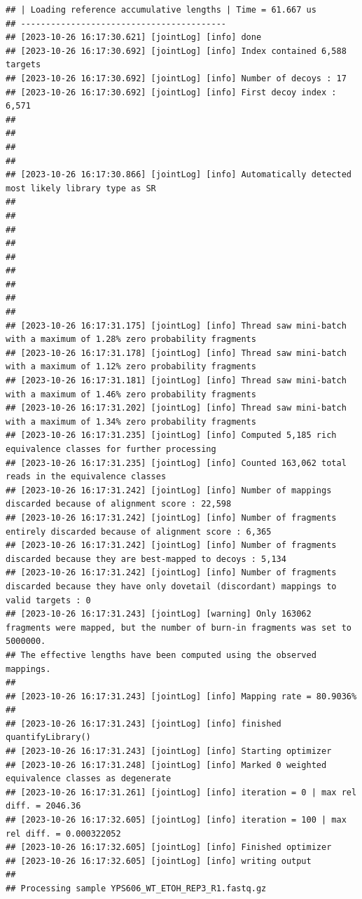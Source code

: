 \documentclass[
]{book}
\begin{document}
\begin{verbatim}
## | Loading reference accumulative lengths | Time = 61.667 us
## -----------------------------------------
## [2023-10-26 16:17:30.621] [jointLog] [info] done
## [2023-10-26 16:17:30.692] [jointLog] [info] Index contained 6,588 targets
## [2023-10-26 16:17:30.692] [jointLog] [info] Number of decoys : 17
## [2023-10-26 16:17:30.692] [jointLog] [info] First decoy index : 6,571 
## 
## 
## 
## 
## [2023-10-26 16:17:30.866] [jointLog] [info] Automatically detected most likely library type as SR
## 
## 
## 
## 
## 
## 
## 
## 
## 
## [2023-10-26 16:17:31.175] [jointLog] [info] Thread saw mini-batch with a maximum of 1.28% zero probability fragments
## [2023-10-26 16:17:31.178] [jointLog] [info] Thread saw mini-batch with a maximum of 1.12% zero probability fragments
## [2023-10-26 16:17:31.181] [jointLog] [info] Thread saw mini-batch with a maximum of 1.46% zero probability fragments
## [2023-10-26 16:17:31.202] [jointLog] [info] Thread saw mini-batch with a maximum of 1.34% zero probability fragments
## [2023-10-26 16:17:31.235] [jointLog] [info] Computed 5,185 rich equivalence classes for further processing
## [2023-10-26 16:17:31.235] [jointLog] [info] Counted 163,062 total reads in the equivalence classes 
## [2023-10-26 16:17:31.242] [jointLog] [info] Number of mappings discarded because of alignment score : 22,598
## [2023-10-26 16:17:31.242] [jointLog] [info] Number of fragments entirely discarded because of alignment score : 6,365
## [2023-10-26 16:17:31.242] [jointLog] [info] Number of fragments discarded because they are best-mapped to decoys : 5,134
## [2023-10-26 16:17:31.242] [jointLog] [info] Number of fragments discarded because they have only dovetail (discordant) mappings to valid targets : 0
## [2023-10-26 16:17:31.243] [jointLog] [warning] Only 163062 fragments were mapped, but the number of burn-in fragments was set to 5000000.
## The effective lengths have been computed using the observed mappings.
## 
## [2023-10-26 16:17:31.243] [jointLog] [info] Mapping rate = 80.9036%
## 
## [2023-10-26 16:17:31.243] [jointLog] [info] finished quantifyLibrary()
## [2023-10-26 16:17:31.243] [jointLog] [info] Starting optimizer
## [2023-10-26 16:17:31.248] [jointLog] [info] Marked 0 weighted equivalence classes as degenerate
## [2023-10-26 16:17:31.261] [jointLog] [info] iteration = 0 | max rel diff. = 2046.36
## [2023-10-26 16:17:32.605] [jointLog] [info] iteration = 100 | max rel diff. = 0.000322052
## [2023-10-26 16:17:32.605] [jointLog] [info] Finished optimizer
## [2023-10-26 16:17:32.605] [jointLog] [info] writing output 
## 
## Processing sample YPS606_WT_ETOH_REP3_R1.fastq.gz

\end{verbatim}
\end{document}
